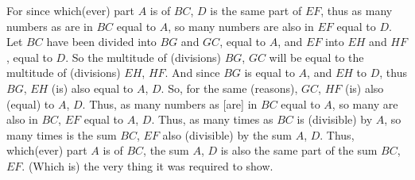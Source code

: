 \begin{Parallel}{}{}
{For since which(ever) part $A$ is of $BC$, $D$ is the same part of $EF$, thus as many
numbers as are in $BC$ equal to $A$, so many numbers are also in 
$EF$ equal to $D$. Let $BC$ have been divided into $BG$ and $GC$, equal to $A$, and
$EF$ into $EH$ and $HF$, equal to $D$. So the multitude of (divisions) $BG$,
$GC$ will be equal to the multitude of (divisions) $EH$, $HF$. And
since $BG$ is equal to $A$, and $EH$ to $D$, thus $BG$, $EH$ (is) also equal to $A$, $D$.
So, for the same (reasons), $GC$, $HF$ (is) also (equal) to $A$, $D$. Thus,
as many numbers as [are] in $BC$ equal to $A$, so many are
also in $BC$, $EF$ equal to $A$, $D$. Thus, as many times as $BC$ is (divisible)
by $A$, so many times is the sum $BC$, $EF$ also (divisible)  by the sum $A$, $D$.
Thus, which(ever) part $A$ is of $BC$, the sum $A$, $D$ is also the same
part of the sum $BC$, $EF$. (Which is) the very thing it was required to show.}
\end{Parallel}


\vspace{7pt}{\footnotesize\noindent$^\dag$ In modern notation, this
proposition states that if $a = (1/n)\,b$ and $c = (1/n)\,d$ then $(a+c) = (1/n)\,(b+d)$,
where all symbols denote numbers.}

